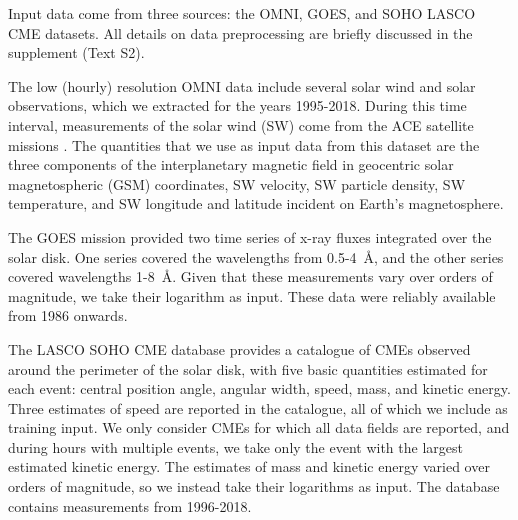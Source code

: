 Input data come from three sources: the OMNI, GOES, and SOHO LASCO CME datasets. All details on data preprocessing are briefly discussed in the supplement (Text S2).

The low (hourly) resolution OMNI data include several solar wind and solar observations, which we extracted for the years 1995-2018. During this time interval, measurements of the solar wind (SW) come from the ACE  satellite missions . The quantities that we use as input data from this dataset are the three components of the interplanetary magnetic field in geocentric solar magnetospheric (GSM) coordinates, SW velocity, SW particle density, SW temperature, and SW longitude and latitude incident on Earth's magnetosphere. 

The GOES mission provided two time series of x-ray fluxes integrated over the solar disk. One series covered the wavelengths from 0.5-4~\r{A}, and the other series covered wavelengths 1-8~\r{A}. Given that these measurements vary over orders of magnitude, we take their logarithm as input. These data were reliably available from 1986 onwards.

The LASCO SOHO CME database provides a catalogue of CMEs observed around the perimeter of the solar disk, with five basic quantities estimated for each event: central position angle, angular width, speed, mass, and kinetic energy. Three estimates of speed are reported in the catalogue, all of which we include as training input. We only consider CMEs for which all data fields are reported, and during hours with multiple events, we take only the event with the largest estimated kinetic energy. The estimates of mass and kinetic energy varied over orders of magnitude, so we instead take their logarithms as input. The database contains measurements from 1996-2018.


